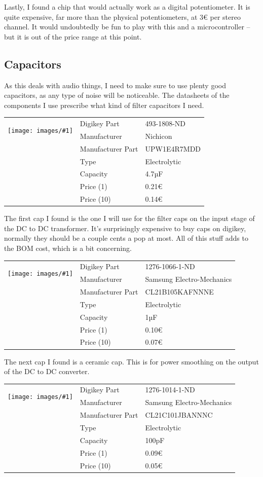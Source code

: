 \documentclass[a4paper]{article}
\makeatletter
\newenvironment{partdisplay}[1]{
\begin{center}
\begin{tabular}{@{}p{3cm}p{3cm}p{4.5cm}@{}}
\multirow{2}{3cm}{\texttt{[image: images/\#1]}}}{
\end{tabular}
\end{center}}
\makeatother
\begin{document}
Lastly, I found a chip that would actually work as a digital potentiometer. It is quite expensive, far more than the physical potentiometers, at 3€ per stereo channel. It would undoubtedly be fun to play with this and a microcontroller -- but it is out of the price range at this point.

\subsection{Capacitors}

As this deals with audio things, I need to make sure to use plenty good capacitors, as any type of noise will be noticeable. The datasheets of the components I use prescribe what kind of filter capacitors I need.

\begin{partdisplay}{nichion47cap}
& Digikey Part & 493-1808-ND\\
& Manufacturer & Nichicon\\
& Manufacturer Part & UPW1E4R7MDD\\
& Type & Electrolytic\\
& Capacity & 4.7µF\\
& Price (1) & 0.21€\\
& Price (10) & 0.14€\\  
\end{partdisplay}

The first cap I found is the one I will use for the filter caps on the input stage of the DC to DC transformer. It's surprisingly expensive to buy caps on digikey, normally they should be a couple cents a pop at most. All of this stuff adds to the BOM cost, which is a bit concerning.

\begin{partdisplay}{samsung8050}
& Digikey Part & 1276-1066-1-ND\\
& Manufacturer & Samsung Electro-Mechanics\\
& Manufacturer Part & CL21B105KAFNNNE\\
& Type & Electrolytic\\
& Capacity & 1µF\\
& Price (1) & 0.10€\\
& Price (10) & 0.07€\\  
\end{partdisplay}

The next cap I found is a ceramic cap. This is for power smoothing on the output of the DC to DC converter.

\begin{partdisplay}{samsung8050}
& Digikey Part & 1276-1014-1-ND\\
& Manufacturer & Samsung Electro-Mechanics\\
& Manufacturer Part & CL21C101JBANNNC\\
& Type & Electrolytic\\
& Capacity & 100pF\\
& Price (1) & 0.09€\\
& Price (10) & 0.05€\\  
\end{partdisplay}
\end{document}
